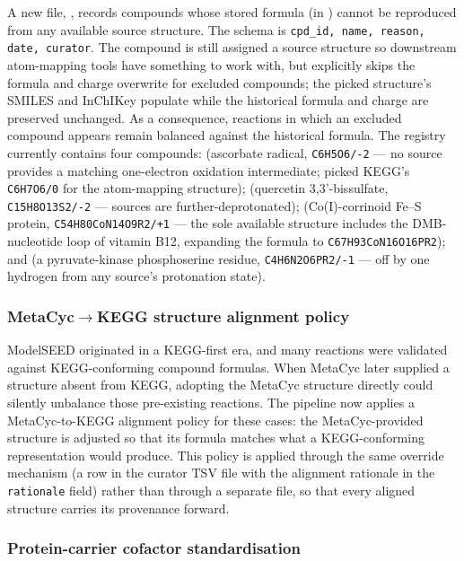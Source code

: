 A new file, ,
records compounds whose stored formula (in ) cannot be
reproduced from any available source structure. The schema is
\texttt{cpd\_id, name, reason, date, curator}. The compound is still assigned a
source structure so downstream atom-mapping tools have something to work with,
but  explicitly skips the
formula and charge overwrite for excluded compounds; the picked structure's
SMILES and InChIKey populate  while the historical
formula and charge are preserved unchanged. As a consequence, reactions in which
an excluded compound appears remain balanced against the historical formula. The
registry currently contains four compounds:  (ascorbate radical,
\texttt{C6H5O6/-2} --- no source provides a matching one-electron oxidation
intermediate; picked KEGG's \texttt{C6H7O6/0} for the atom-mapping structure);
 (quercetin 3,3'-bissulfate, \texttt{C15H8O13S2/-2} --- sources are
further-deprotonated);  (Co(I)-corrinoid Fe--S protein,
\texttt{C54H80CoN14O9R2/+1} --- the sole available structure includes the
DMB-nucleotide loop of vitamin B12, expanding the formula to
\texttt{C67H93CoN16O16PR2}); and  (a pyruvate-kinase phosphoserine
residue, \texttt{C4H6N2O6PR2/-1} --- off by one hydrogen from any source's
protonation state).

\subsubsection{MetaCyc$\rightarrow$KEGG structure alignment policy}

ModelSEED originated in a KEGG-first era, and many reactions were validated
against KEGG-conforming compound formulas. When MetaCyc later supplied a
structure absent from KEGG, adopting the MetaCyc structure directly could
silently unbalance those pre-existing reactions. The pipeline now applies a
MetaCyc-to-KEGG alignment policy for these cases: the MetaCyc-provided structure
is adjusted so that its formula matches what a KEGG-conforming representation
would produce. This policy is applied through the same override mechanism (a row
in the curator TSV file with the alignment rationale in the \texttt{rationale}
field) rather than through a separate file, so that every aligned structure
carries its provenance forward.

\subsubsection{Protein-carrier cofactor standardisation}

